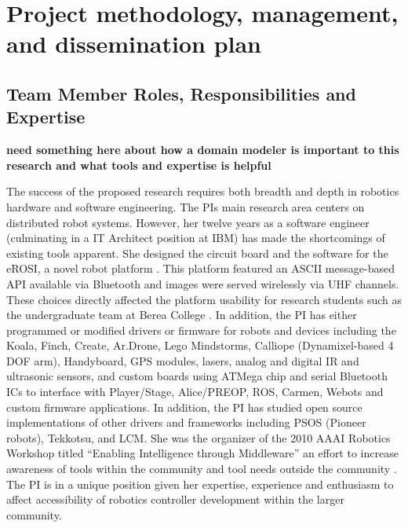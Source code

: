 
\section{Project methodology, management, and dissemination plan}
\subsection{Team Member Roles, Responsibilities and Expertise}

{\bf need something here about how a domain modeler is important to this research and what tools and expertise is helpful}

The success of the proposed research requires both breadth and depth in robotics hardware and software engineering.  The PIs main research area centers on distributed robot systems.  However, her twelve years as a software engineer (culminating in a IT Architect position at IBM) has made the shortcomings of existing tools apparent.  She designed the circuit board and the software for the eROSI, a novel robot platform \cite{walter2007design}.  This platform featured an ASCII message-based API available via Bluetooth and images were served wirelessly via UHF channels.  These choices directly affected the platform usability for research students such as the undergraduate team at Berea College \cite{Isaacs2006}.  In addition, the PI has either programmed or modified drivers or firmware for robots and devices including the Koala, Finch, Create, Ar.Drone, Lego Mindstorms, Calliope (Dynamixel-based 4 DOF arm), Handyboard, GPS modules, lasers, analog and digital IR and ultrasonic sensors, and custom boards using ATMega chip and serial Bluetooth ICs to interface with Player/Stage, Alice/PREOP, ROS, Carmen, Webots and custom firmware applications.  In addition, the PI has studied open source implementations of other drivers and frameworks including PSOS (Pioneer robots), Tekkotsu, and LCM.  She was the organizer of the 2010 AAAI Robotics Workshop titled ``Enabling Intelligence through Middleware'' an effort to increase awareness of tools within the community and tool needs outside the community \cite{MonicaAnderson2011}. The PI is in a unique position given her expertise, experience and enthusiasm to affect accessibility of robotics controller development within the larger community.

